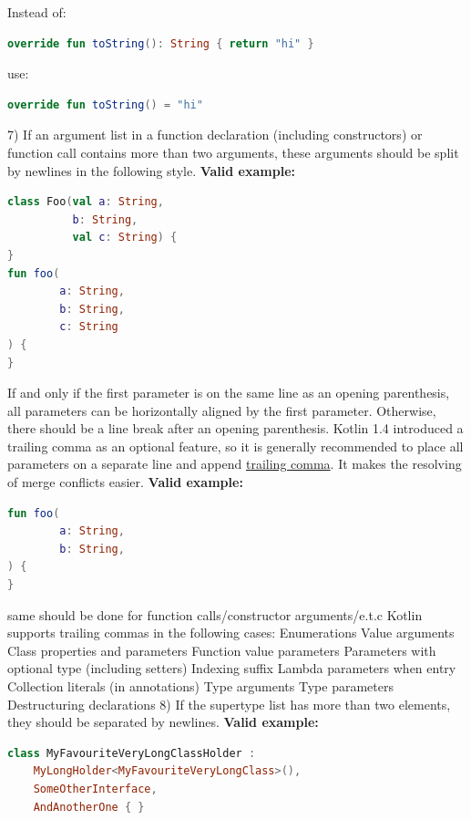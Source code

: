 Instead of: 
\begin{lstlisting}[language=Kotlin]
override fun toString(): String { return "hi" }
\end{lstlisting}
use:
\begin{lstlisting}[language=Kotlin]
override fun toString() = "hi"
\end{lstlisting}
7)  If an argument list in a function declaration (including constructors) or function call contains more than two arguments, these arguments should be split by newlines in the following style.
\textbf{Valid example:} 
\begin{lstlisting}[language=Kotlin]
class Foo(val a: String,
          b: String,
          val c: String) {
}
fun foo(
        a: String,
        b: String,
        c: String
) {
}
\end{lstlisting}
If and only if the first parameter is on the same line as an opening parenthesis, all parameters can be horizontally aligned by the first parameter.
Otherwise, there should be a line break after an opening parenthesis.
Kotlin 1.4 introduced a trailing comma as an optional feature, so it is generally recommended to place all parameters on a separate line
and append \href{https://kotlinlang.org/docs/reference/whatsnew14.html#trailing-comma}{trailing comma}.
It makes the resolving of merge conflicts easier.
\textbf{Valid example:} 
\begin{lstlisting}[language=Kotlin]
fun foo(
        a: String,
        b: String,
) {
}
\end{lstlisting}
same should be done for function calls/constructor arguments/e.t.c
Kotlin supports trailing commas in the following cases:
Enumerations
Value arguments
Class properties and parameters
Function value parameters
Parameters with optional type (including setters)
Indexing suffix
Lambda parameters
when entry
Collection literals (in annotations)
Type arguments
Type parameters
Destructuring declarations
8) If the supertype list has more than two elements, they should be separated by newlines.
\textbf{Valid example:} 
\begin{lstlisting}[language=Kotlin]
class MyFavouriteVeryLongClassHolder :
    MyLongHolder<MyFavouriteVeryLongClass>(),
    SomeOtherInterface,
    AndAnotherOne { }
\end{lstlisting}
